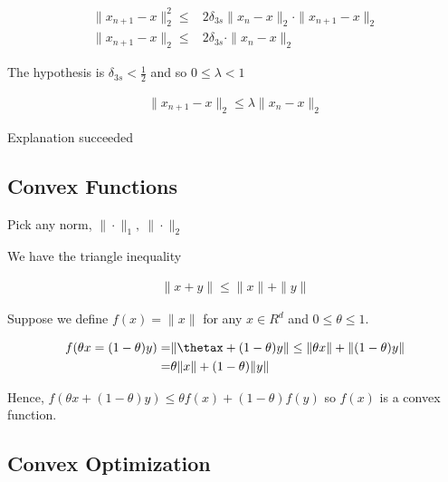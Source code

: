 \documentclass[11pt]{article}
\begin{document}
\begin{equation}
\begin{split}
\|x_{n + 1} - x\|_2^2 \leq & 2 \delta_{3s} \|x_{n} - x\|_2 \cdot \|x_{n + 1} - x\|_2\\
\|x_{n + 1} - x\|_2 \leq & 2 \delta_{3s} \cdot \|x_n - x\|_2
\end{split}
\end{equation}

The hypothesis is \(\delta_{3s} < \frac{1}{2}\) and so \(0 \leq \lambda < 1\)

\begin{equation}
\begin{split}
\|x_{n + 1} - x\|_2 \leq \lambda \|x_n - x\|_2
\end{split}
\end{equation}

Explanation succeeded

\subsection{Convex Functions}
\label{sec:org678ea73}

Pick any norm, \(\|\cdot\|_1, \ \|\cdot\|_2\)

We have the triangle inequality

\begin{equation}
\begin{split}
\|x + y\| \leq \|x\| + \|y\|
\end{split}
\end{equation}

Suppose we define \(f(x) = \|x\|\) for any \(x \in R^d\) and \(0 \leq \theta \leq 1\).

\begin{equation}
\begin{split}
f(\theta x = (1 - \theta) y) = & \|\thetax + (1 - \theta)y\| \leq \|\theta x\| + \|(1 - \theta) y\|\\
= & \theta \|x\| + (1 - \theta) \|y\|
\end{split}
\end{equation}



Hence, \(f(\theta x + (1 - \theta) y) \leq \theta f(x) + (1 - \theta) f(y)\) so
\(f(x)\) is a convex function.

\subsection{Convex Optimization}
\label{sec:org480da42}
\end{document}
